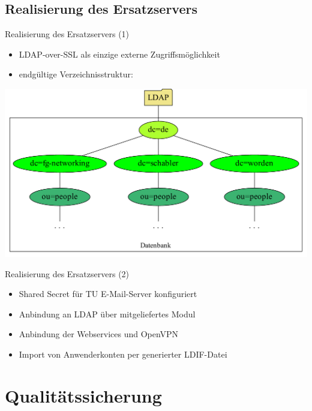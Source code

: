 \documentclass[presentation,svgnames,12pt]{beamer}
\begin{document}
\subsection{Realisierung des Ersatzservers}
\begin{frame}{Realisierung des Ersatzservers (1)}
\begin{itemize}
	\item LDAP-over-SSL als einzige externe Zugriffsmöglichkeit
	\item endgültige Verzeichnisstruktur:
\end{itemize}
\centering
\includegraphics[width=\textwidth]{Bilder/LDAP-fgn.pdf}
\end{frame}


\begin{frame}{Realisierung des Ersatzservers (2)}
\begin{itemize}
	\item Shared Secret für TU E-Mail-Server konfiguriert
	\item Anbindung an LDAP über mitgeliefertes Modul
	\item Anbindung der Webservices und OpenVPN
	\item Import von Anwenderkonten per generierter LDIF-Datei
\end{itemize}
\end{frame}


\section{Qualitätssicherung}
\end{document}
